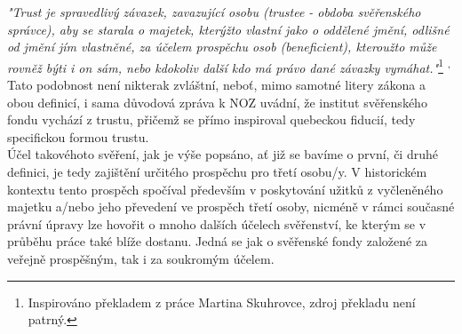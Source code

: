 \documentclass{article}
\begin{document}
\textit{"Trust je spravedlivý závazek, zavazující osobu (trustee - obdoba svěřenského správce), aby se starala o majetek, kterýžto vlastní jako o oddělené jmění, odlišné od jmění jím vlastněné, za účelem prospěchu osob (beneficient), kteroužto může rovněž býti i on sám, nebo kdokoliv další kdo má právo dané závazky vymáhat."}\footnote{Inspirováno překladem z práce Martina Skuhrovce, zdroj překladu není patrný.} \textsuperscript{,}   \\

Tato podobnost není nikterak zvláštní, neboť, mimo samotné litery zákona a obou definicí, i sama důvodová zpráva k NOZ uvádní, že institut svěřenského fondu vychází z trustu, přičemž se přímo inspiroval quebeckou fiducií, tedy specifickou formou trustu.\\


Účel takovéhoto svěření, jak je výše popsáno, ať již se bavíme o první, či druhé definici, je tedy zajištění určitého prospěchu pro třetí osobu/y. V historickém kontextu tento prospěch spočíval především v poskytování užitků z vyčleněného majetku a/nebo jeho převedení ve prospěch třetí osoby, nicméně v rámci současné právní úpravy lze hovořit o mnoho dalších účelech svěřenství, ke kterým se v průběhu práce také blíže dostanu. Jedná se jak o svěřenské fondy založené za veřejně prospěšným, tak i za soukromým účelem.\\
\end{document}
